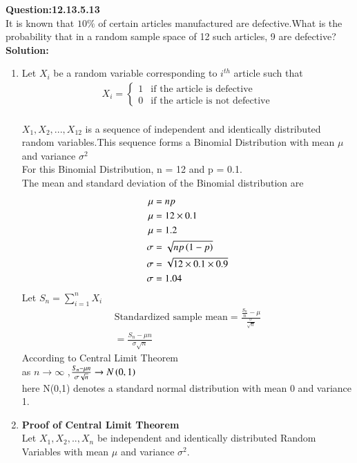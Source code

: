 \documentclass[journal,12pt,twocolumn]{IEEEtran}
\begin{document}
\textbf{Question:12.13.5.13}\\
 	It is known that $ 10\% $ of certain articles manufactured are defective.What is the probability that in a random sample space of 12 such articles, 9 are defective?
\\
 \textbf{Solution:}
 \\
 \begin{enumerate}[label=(\Roman*), align=left]
    \item
Let $X_i$ be a random variable corresponding to $i^{th}$ article such that
\begin{align}
        X_i=  
        \begin{cases}
            1 &  \text{if the article is defective} \\
            0 &  \text{if the article is not defective}
        \end{cases}
    \end{align}
\\$X_1,X_2,...,X_{12}$ is a sequence of independent and identically distributed random variables.This sequence forms a Binomial Distribution with mean $\mu$ and variance $\sigma^2$
 \\For this Binomial Distribution, n = 12 and p = 0.1.
 \\The mean and standard deviation of the Binomial distribution are
 \begin{align}
    \mu &= np\\
    \mu &= 12\times0.1\nonumber\\
    \mu &= 1.2\\
    \sigma&= \sqrt{np\left(1-p\right)}\\
    \sigma&= \sqrt{12\times0.1\times0.9}\nonumber\\
    \sigma&= 1.04
    \end{align}
Let $S_n = \sum_{i=1}^{n} X_i$
\begin{align}
      \text{Standardized sample mean} = \frac{\frac{S_n}{n}-\mu}{\frac{\sigma}{\sqrt{n}}}\nonumber \\
      = \frac{S_n-\mu{n}}{\sigma{\sqrt{n}}} 
    \end{align}
According to Central Limit Theorem
\\as $n \to \infty$ ,$\frac{S_n -\mu{n}}{\sigma{\sqrt{n}}} \to N\left(0,1\right)$
\\here N(0,1) denotes a standard normal distribution with mean 0 and variance 1.
\item
\textbf{Proof of Central Limit Theorem}
\\Let $X_1,X_2,..,X_n$ be independent and identically distributed Random Variables with mean $\mu$ and variance $\sigma^2$.

\end{enumerate}
\end{document}
